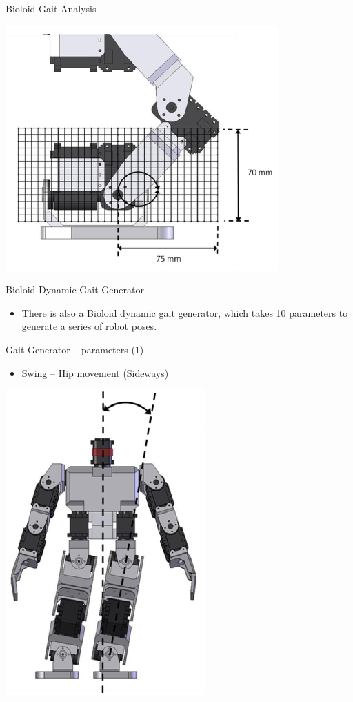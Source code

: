 \documentclass[compress]{beamer}
\begin{document}
\begin{frame}{Bioloid Gait Analysis}
{    \begin{center}
        \includegraphics[width=0.55\linewidth]{image39}
    \end{center}
}
\end{frame}

\begin{frame}{Bioloid Dynamic Gait Generator}

    \begin{itemize}

        \item There is also a Bioloid dynamic gait generator, which takes 10
            parameters to generate a series of robot poses.
    \end{itemize}

\end{frame}

\begin{frame}{Gait Generator -- parameters (1)}

    \begin{itemize}

        \item Swing -- Hip movement (Sideways)
    \end{itemize}

    \begin{center}
        \includegraphics[height=0.5\paperheight]{bioloid-gait-1}
    \end{center}
\end{frame}
\end{document}
